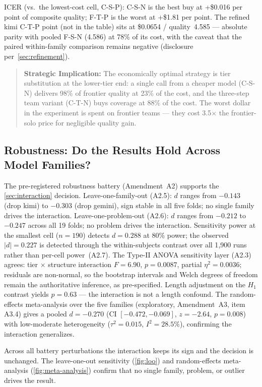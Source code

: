 \documentclass[12pt,a4paper]{article}
\begin{document}
ICER (vs.\ the lowest-cost cell, C-S-P): C-S-N is the best buy at +\$0.016 per
point of composite quality; F-T-P is the worst at +\$1.81 per point. The
refined kimi C-T-P point (not in the table) sits at \$0.0654 / quality~4.585 ---
absolute parity with pooled F-S-N (4.586) at 78\% of its cost, with the caveat
that the paired within-family comparison remains negative (disclosure
per~\cref{sec:refinement}).

\begin{quote}
\textbf{Strategic Implication:} The economically optimal strategy is tier
substitution at the lower-tier end: a single call from a cheaper model
(C-S-N) delivers 98\% of frontier quality at 23\% of the cost, and the
three-step team variant (C-T-N) buys coverage at 88\% of the cost. The worst
dollar in the experiment is spent on frontier teams --- they cost
3.5$\times$ the frontier-solo price for negligible quality gain.
\end{quote}

\subsection{Robustness: Do the Results Hold Across Model Families?}

The pre-registered robustness battery (Amendment~A2) supports the
\cref{sec:interaction} decision.
Leave-one-family-out (A2.5): $d$ ranges from $-0.143$ (drop kimi) to $-0.303$ (drop
gemini), sign stable in all five folds; no single family drives the
interaction. Leave-one-problem-out (A2.6): $d$ ranges from $-0.212$ to $-0.247$ across
all 19 folds; no problem drives the interaction. Sensitivity power at the
smallest cell ($n = 190$) detects $d = 0.288$ at 80\% power; the observed $|d|
= 0.227$ is detected through the within-subjects contrast over all 1{,}900 runs
rather than per-cell power~(A2.7). The Type-II ANOVA sensitivity layer (A2.3)
agrees: tier $\times$ structure interaction $F = 6.90$, $p = 0.0087$, partial
$\eta^2 = 0.0036$; residuals are non-normal, so the bootstrap intervals and
Welch degrees of freedom remain the authoritative inference, as pre-specified.
Length adjustment on the $H_1$ contrast
yields $p = 0.63$ --- the interaction is not a length confound. The
random-effects meta-analysis over the five families (exploratory, Amendment~A3,
item A3.4) gives a pooled $d =
-0.270$ (CI $[-0.472, -0.069]$, $z = -2.64$, $p = 0.008$) with low-moderate
heterogeneity ($\tau^2 = 0.015$, $I^2 = 28.5\%$), confirming the interaction
generalizes.

Across all battery perturbations the interaction keeps its sign and the
decision is unchanged. The leave-one-out sensitivity (\cref{fig:loo})
and random-effects meta-analysis (\cref{fig:meta-analysis}) confirm that no
single family, problem, or outlier drives the result.
\end{document}
